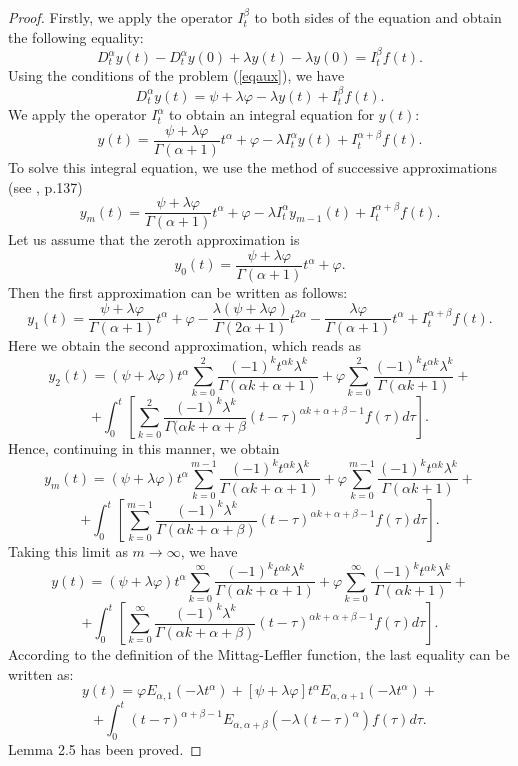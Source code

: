 \documentclass{amsart}
\numberwithin{equation}{section}
\begin{document}
\begin{proof}
 Firstly, we apply the operator  $I_t^\beta$ to both sides of the equation and obtain the following equality:
$$D_t^\alpha y(t)-D_t^\alpha y(0)+\lambda y(t)-\lambda y(0)=I_t^\beta f(t). $$
Using the conditions of the problem (\ref{eqaux}), we have
$$D_t^\alpha y(t)=\psi+\lambda \varphi-\lambda y(t) +I_t^\beta f(t).$$
We apply the operator $I_t^\alpha$ to obtain an integral equation for $y(t)$:
$$y(t)=\frac{\psi+\lambda \varphi}{\Gamma(\alpha+1)}t^\alpha+\varphi-\lambda I_t^\alpha y(t)+I_t^{\alpha+\beta}f(t).$$
To solve this integral equation, we use the method of successive approximations (see \cite{Kilbas}, p.137)
$$y_m(t)=\frac{\psi+\lambda \varphi}{\Gamma(\alpha+1)}t^\alpha+\varphi-\lambda I_t^\alpha y_{m-1}(t)+I_t^{\alpha+\beta}f(t).$$
Let us assume that the zeroth approximation is
$$y_0(t)=\frac{\psi+\lambda \varphi}{\Gamma(\alpha+1)}t^\alpha+\varphi.$$   Then the first approximation can be written as follows:
$$y_1(t)=\frac{\psi+\lambda \varphi}{\Gamma(\alpha+1)}t^\alpha+\varphi-\frac{\lambda(\psi+\lambda \varphi)}{\Gamma(2\alpha+1)}t^{2\alpha}-\frac{\lambda \varphi}{\Gamma(\alpha+1)}t^\alpha+I_t^{\alpha+\beta}f(t).$$
Here we obtain the second approximation, which reads as
$$y_2(t)=(\psi+\lambda\varphi)t^\alpha \sum_{k=0}^2 \frac{(-1)^k t^{\alpha k}\lambda^k}{\Gamma(\alpha k+\alpha+1)}+\varphi \sum_{k=0}^2 \frac{(-1)^k t^{\alpha k}\lambda^k}{\Gamma(\alpha k+1)}+$$
$$+\int_0^t\left[\sum_{k=0}^2 \frac{(-1)^k\lambda^k}{\Gamma(\alpha k+\alpha+\beta} (t-\tau)^{\alpha k+\alpha+\beta-1}  f(\tau) d\tau \right].$$
Hence, continuing in this manner, we obtain
$$y_m(t)=(\psi+\lambda\varphi)t^\alpha \sum_{k=0}^{m-1} \frac{(-1)^k t^{\alpha k}\lambda^k}{\Gamma(\alpha k+\alpha+1)}+\varphi \sum_{k=0}^{m-1} \frac{(-1)^k t^{\alpha k}\lambda^k}{\Gamma(\alpha k+1)}+$$
$$+\int_0^t\left[\sum_{k=0}^{m-1} \frac{(-1)^k\lambda^k}{\Gamma(\alpha k+\alpha+\beta)} (t-\tau)^{\alpha k+\alpha+\beta-1}  f(\tau) d\tau \right ].$$ Taking this limit as $m\to \infty$, we have
$$y(t)=(\psi+\lambda\varphi)t^\alpha \sum_{k=0}^\infty \frac{(-1)^k t^{\alpha k}\lambda^k}{\Gamma(\alpha k+\alpha+1)}+\varphi \sum_{k=0}^\infty \frac{(-1)^k t^{\alpha k}\lambda^k}{\Gamma(\alpha k+1)}+$$
$$+\int_0^t\left[\sum_{k=0}^\infty \frac{(-1)^k\lambda^k}{\Gamma(\alpha k+\alpha+\beta)} (t-\tau)^{\alpha k+\alpha+\beta-1}  f(\tau) d\tau \right].$$
According to the definition of the Mittag-Leffler function, the last equality can be written as:
$$y(t)=\varphi E_{\alpha,1}(-\lambda t^\alpha)+[\psi+\lambda \varphi]t^\alpha E_{\alpha,\alpha+1}(-\lambda t^\alpha)+$$
$$+ \int_0^t (t-\tau)^{\alpha+\beta-1} E_{\alpha,\alpha+\beta}(-\lambda (t-\tau)^\alpha)f(\tau)  d\tau. $$
Lemma 2.5 has been proved.
\end{proof}
\end{document}

